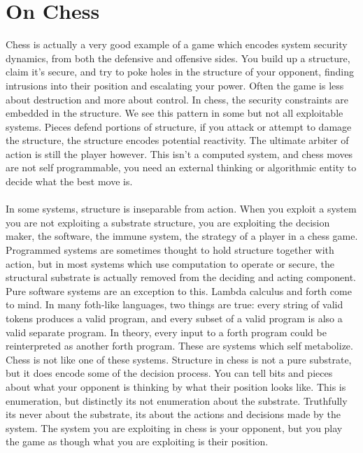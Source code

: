 \documentclass{article}
\begin{document}
	\section{On Chess}
	Chess is actually a very good example of a game which encodes system security dynamics, from both the defensive and offensive sides. You build up a structure, claim it's secure, and try to poke holes in the structure of your opponent, finding intrusions into their position and escalating your power. Often the game is less about destruction and more about control. In chess, the security constraints are embedded in the structure. We see this pattern in some but not all exploitable systems. Pieces defend portions of structure, if you attack or attempt to damage the structure, the structure encodes potential reactivity. The ultimate arbiter of action is still the player however. This isn't a computed system, and chess moves are not self programmable, you need an external thinking or algorithmic entity to decide what the best move is.\\\\
	In some systems, structure is inseparable from action. When you exploit a system you are not exploiting a substrate structure, you are exploiting the decision maker, the software, the immune system, the strategy of a player in a chess game. Programmed systems are sometimes thought to hold structure together with action, but in most systems which use computation to operate or secure, the structural substrate is actually removed from the deciding and acting component. Pure software systems are an exception to this. Lambda calculus and forth come to mind. In many foth-like languages, two things are true: every string of valid tokens produces a valid program, and every subset of a valid program is also a valid separate program. In theory, every input to a forth program could be reinterpreted as another forth program. These are systems which self metabolize. Chess is not like one of these systems. Structure in chess is not a pure substrate, but it does encode some of the decision process. You can tell bits and pieces about what your opponent is thinking by what their position looks like. This is enumeration, but distinctly its not enumeration about the substrate. Truthfully its never about the substrate, its about the actions and decisions made by the system. The system you are exploiting in chess is your opponent, but you play the game as though what you are exploiting is their position. 
\end{document}
